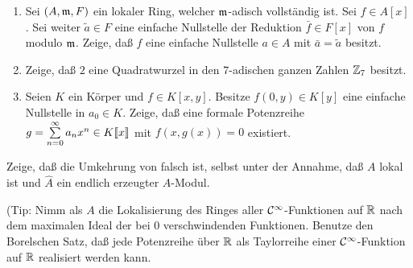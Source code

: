 \begin{exercise}
	\begin{enumerate}
	\item
		Sei \((A, \mathfrak{m}, F)\) ein lokaler Ring, welcher \(\mathfrak{m}\)-adisch vollständig ist. Sei \(f \in A[x]\).
		Sei weiter \(\tilde a \in F\) eine einfache Nullstelle der Reduktion \(\bar f \in F[x]\) von \(f\) modulo \(\mathfrak{m}\).
		Zeige, daß \(f\) eine einfache Nullstelle \(a \in A\) mit \(\bar a = \tilde a\) besitzt.
	\item
		Zeige, daß \(2\) eine Quadratwurzel in den \(7\)-adischen ganzen Zahlen \(\mathbb Z_7\) besitzt.
	\item
		Seien \(K\) ein Körper und \(f \in K[x, y]\). Besitze \(f(0, y) \in K[y]\) eine einfache Nullstelle in \(a_0 \in K\).
		Zeige, daß eine formale Potenzreihe \(g = \sum\limits_{n = 0}^\infty a_n x^n \in K\llbracket x\rrbracket\) mit \(f(x, g(x)) = 0\) existiert.
	\end{enumerate}
\end{exercise}

\begin{exercise}
	Zeige, daß die Umkehrung von  falsch ist, selbst unter der Annahme, daß \(A\) lokal ist und
	\(\hat A\) ein endlich erzeugter \(A\)-Modul.
	
	(Tip: Nimm als \(A\) die Lokalisierung des Ringes aller \(\mathcal{C}^\infty\)-Funktionen auf \(\mathbb R\) nach dem maximalen Ideal
	der bei \(0\) verschwindenden Funktionen. Benutze den Borelschen Satz, daß jede Potenzreihe über \(\mathbb R\) als Taylorreihe einer
	\(\mathcal{C}^\infty\)-Funktion auf \(\mathbb R\) realisiert werden kann.
\end{exercise}


